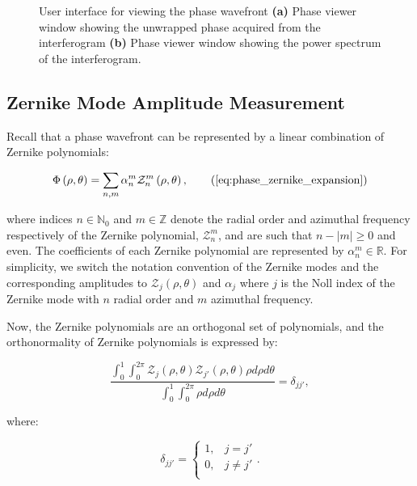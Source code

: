 \begin{figure}[h]
\begin{subfigure}{0.45\textwidth}
		\caption{}
		\label{fig:phase_viewer_ft}
	\end{subfigure}
	\caption[User interface for viewing the phase wavefront]{User interface for viewing the phase wavefront \textbf{(a)} Phase viewer window showing the unwrapped phase acquired from the interferogram \textbf{(b)} Phase viewer window showing the power spectrum of the interferogram. }
	\label{fig:phase_viewer}
\end{figure}

\subsection{Zernike Mode Amplitude Measurement}
\label{subsec:zernike_mode_measurment}

Recall that a phase wavefront can be represented by a linear combination of Zernike polynomials:

\begin{equation}
\Phi\left(\rho,\theta\right) = \sum\limits_{n,m}\alpha^{m}_{n}\mathcal{Z}^{m}_{n}\left(\rho,\theta\right),\tag{\ref{eq:phase_zernike_expansion}}
\end{equation}

where indices $n \in \mathbb{N}_{0}$ and $m \in \mathbb{Z}$ denote the radial order and azimuthal frequency respectively of the Zernike polynomial, $\mathcal{Z}^{m}_{n}$, and are such that $n - \left|m\right| \ge 0$ and even. The coefficients of each Zernike polynomial are represented by $\alpha^{m}_{n} \in \mathbb{R}$. For simplicity, we switch the notation convention of the Zernike modes and the corresponding amplitudes to $\mathcal{Z}_{j}\left(\rho,\theta\right)$ and $\alpha_{j}$ where $j$ is the Noll index of the Zernike mode with $n$ radial order and $m$ azimuthal frequency.

Now, the Zernike polynomials are an orthogonal set of polynomials, and the orthonormality of Zernike polynomials is expressed by\cite{lakshminarayanan2011zernike}:

\begin{equation}\label{eq:orthonormality}
\frac{\int_{0}^{1}\int_{0}^{2\pi}\mathcal{Z}_{j}\left(\rho,\theta\right)\mathcal{Z}_{j'}\left(\rho,\theta\right)\rho d\rho d\theta}{\int_{0}^{1}\int_{0}^{2\pi}\rho d\rho d\theta} = \delta_{jj'},
\end{equation}

where:

\begin{equation}\label{eq:delta_j}
\delta_{jj'} = 
\begin{cases}
1, & j = j'\\
0, & j \ne j'\\ 
\end{cases}.
\end{equation}

